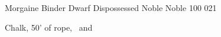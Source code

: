 
\begin{filledCS}%
  {Morgaine Binder}%
  {Dwarf}%
  {Dispossessed Noble}%
  {Noble}%
  {{1}{0}{0}}%
  {{0}{2}{1}}%
  {%
    \shortsword
    \partialleather
    \setcounter{Academics}{1}
    \setcounter{Caving}{1}
    \setcounter{Empathy}{2}
    \setcounter{Vigilance}{2}
    \setcounter{Fate}{1}
    \addtocounter{equipmentWeight}{-1}
  }%
  {}%
  {Chalk, 50' of rope, \rations\ and \rations}%

  \renewcommand\rank{Fodder}
  \renewcommand\characterDebt{100 \glspl{sp}}
  \renewcommand\charSpells{
    \showSpells{Fate1}
    \showSpells{Fate1}
  }

\end{filledCS}

